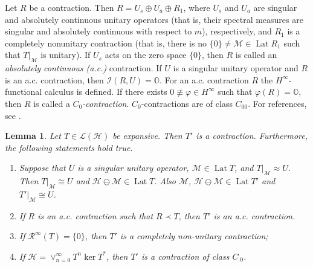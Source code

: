 \documentclass[a4paper,oneside,11pt]{amsart}
\numberwithin{equation}{section}
\theoremstyle{plain}
\newtheorem{lemma}[theorem]{Lemma}
\theoremstyle{definition}
\begin{document}
Let $R$ be a contraction. Then $R=U_s\oplus U_a\oplus R_1$, where $U_s$ and $U_a$ are singular and absolutely 
continuous  unitary operators (that is, their spectral measures are singular and absolutely 
continuous  with respect to $m$), respectively, and $R_1$ is a completely nonunitary contraction (that  is, there is no 
$\{0\}\neq\mathcal M\in\operatorname{Lat}R_1$ such that  $T|_{\mathcal M}$ is unitary). 
If $U_s$ acts on the zero space $\{0\}$, then $R$ is called an \emph{absolutely continuous (a.c.)} contraction. If 
$U$ is a singular unitary operator and $R$ is an a.c. contraction, then $\mathcal I(R,U)=\mathbb O$. 
For an a.c. contraction $R$ the $H^\infty$-functional calculus is defined. If there exists $0\not\equiv\varphi\in H^\infty$ 
such that $\varphi(R)=\mathbb O$, then $R$ is called a \emph{$C_0$-contraction}. $C_0$-contractions are of class $C_{00}$. 
 For references, see {\cite[Theorems I.3.2, II.2.3, II.6.4, and Secs. III.2, III.4]{nfbk}}. 




 
\begin{lemma}\label{lemnotuu} Let $T\in\mathcal L(\mathcal H)$ be expansive. Then $T'$ is a contraction.
Furthermore, the following statements hold true.
\begin{enumerate}[\upshape (i)]
\item Suppose that $U$ is a singular unitary operator,  $\mathcal M\in\operatorname{Lat}T$,  
and $T|_{\mathcal M}\approx U$. 
Then $T|_{\mathcal M}\cong U$ and  $\mathcal H\ominus\mathcal M\in\operatorname{Lat}T$. Also  
 $\mathcal M$,  $\mathcal H\ominus\mathcal M\in\operatorname{Lat}T'$ and  $T'|_{\mathcal M}\cong U$. 
\item If $R$ is an a.c. contraction such that $R\prec T$, then $T'$ is an a.c. contraction.
\item If $\mathcal R^\infty(T)=\{0\}$, 
then $T'$ is a completely non-unitary contraction; 
\item If  $\mathcal H=\vee_{n=0}^\infty T^n\ker T^*$, then $T'$ is a contraction of class $C_{\cdot 0}$.
\end{enumerate}
\end{lemma} 
\end{document}
